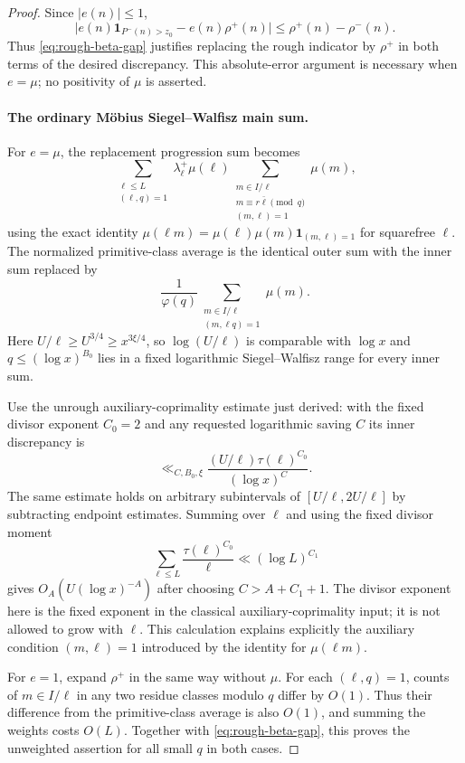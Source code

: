 \begin{proof}
Since $|e(n)|\le1$,
\[
 \big|e(n)\mathbf1_{P^-(n)>z_0}-e(n)\rho^+(n)\big|
       \le\rho^+(n)-\rho^-(n).
\]
Thus \eqref{eq:rough-beta-gap} justifies replacing the rough
indicator by $\rho^+$ in both terms of the desired discrepancy.
This absolute-error argument is necessary when $e=\mu$;
no positivity of $\mu$ is asserted.

\paragraph{The ordinary Möbius Siegel--Walfisz main sum.}
For $e=\mu$, the replacement progression sum becomes
\[
 \sum_{\substack{\ell\le L\\(\ell,q)=1}}
   \lambda^+_\ell\mu(\ell)
 \sum_{\substack{m\in I/\ell\\
             m\equiv r\bar\ell\pmod q\\(m,\ell)=1}}\mu(m),
\]
using the exact identity
$\mu(\ell m)=\mu(\ell)\mu(m)\mathbf1_{(m,\ell)=1}$
for squarefree $\ell$.
The normalized primitive-class average is the identical outer
sum with the inner sum replaced by
\[
 \frac1{\varphi(q)}
       \sum_{\substack{m\in I/\ell\\(m,\ell q)=1}}\mu(m).
\]
Here $U/\ell\ge U^{3/4}\ge x^{3\xi/4}$, so
$\log(U/\ell)$ is comparable with $\log x$ and
$q\le(\log x)^{B_0}$ lies in a fixed logarithmic
Siegel--Walfisz range for every inner sum.

Use the unrough auxiliary-coprimality estimate just derived:
with the fixed divisor exponent $C_0=2$ and any requested
logarithmic saving $C$ its inner discrepancy is
\[
 \ll_{C,B_0,\xi}
       \frac{(U/\ell)\tau(\ell)^{C_0}}{(\log x)^C}.
\]
The same estimate holds on arbitrary subintervals of
$[U/\ell,2U/\ell]$ by subtracting endpoint estimates.
Summing over $\ell$ and using the fixed divisor moment
\[
 \sum_{\ell\le L}\frac{\tau(\ell)^{C_0}}{\ell}
                   \ll(\log L)^{C_1}
\]
gives $O_A(U(\log x)^{-A})$ after choosing
$C>A+C_1+1$. The divisor exponent here is the fixed exponent
in the classical auxiliary-coprimality input; it is not
allowed to grow with $\ell$.
This calculation explains explicitly the auxiliary condition
$(m,\ell)=1$ introduced by the identity for $\mu(\ell m)$.

For $e=1$, expand $\rho^+$ in the same way without $\mu$.
For each $(\ell,q)=1$, counts of $m\in I/\ell$ in any two
residue classes modulo $q$ differ by $O(1)$.
Thus their difference from the primitive-class average
is also $O(1)$, and summing the weights costs $O(L)$.
Together with \eqref{eq:rough-beta-gap}, this proves the
unweighted assertion for all small $q$ in both cases.


\end{proof}
